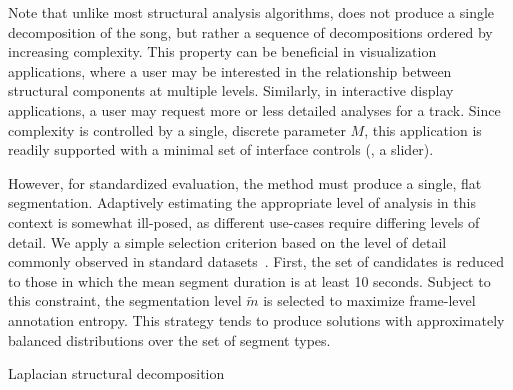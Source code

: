 \documentclass{article}
\begin{document}
Note that unlike most structural analysis algorithms,  does not produce a
single decomposition of the song, but rather a sequence of decompositions ordered by 
increasing complexity.  This property can be beneficial in visualization applications,
where a user may be interested in the relationship between structural components at
multiple levels.  Similarly, in interactive display applications, a user may request 
more or less detailed analyses for a track.  Since complexity is controlled by
a single, discrete parameter $M$, this application is readily supported with a minimal
set of interface controls (\eg, a slider).

However, for standardized evaluation, the method must produce a single, flat
segmentation.  Adaptively estimating the appropriate level of analysis in
this context is somewhat ill-posed, as different use-cases require differing levels of 
detail.  We apply a simple selection criterion based on the level of detail
commonly observed in standard datasets~\cite{harte2010towards,smith2011design}.  
First, the set of candidates is reduced to those in which the mean segment duration is 
at least 10 seconds.  
Subject to this constraint, the segmentation level $\tilde{m}$ is selected to maximize
frame-level annotation entropy.  This strategy tends to produce solutions with 
approximately balanced distributions over the set of segment types.  




\begin{algorithm}[t]
\caption{Laplacian structural decomposition\label{lsd}}
\begin{algorithmic}[1]
 
 
\EndFor{}
\EndFunction{}
\end{algorithmic}
\end{algorithm}
\end{document}

